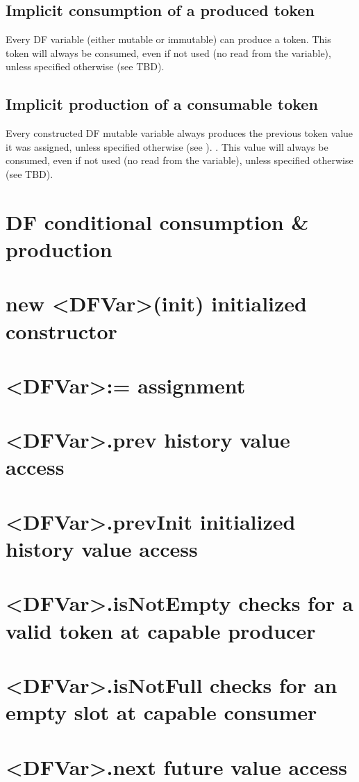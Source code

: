 \subsection*{Implicit consumption of a produced token}
Every DF variable (either mutable or immutable) can produce a token. This token will always be consumed, even if not used (no read from the variable), unless specified otherwise (see TBD). 

\subsection*{Implicit production of a consumable token}
Every constructed DF mutable variable always produces the previous token value it was assigned, unless specified otherwise (see ). . This value will always be consumed, even if not used (no read from the variable), unless specified otherwise (see TBD).

\section{DF conditional consumption \& production}
\section{new <DFVar>(init) initialized constructor}
\section{<DFVar>:= assignment}
\section{<DFVar>.prev history value access}
\section{<DFVar>.prevInit initialized history value access}
\section{<DFVar>.isNotEmpty checks for a valid token at capable producer}
\section{<DFVar>.isNotFull checks for an empty slot at capable consumer}
\section{<DFVar>.next future value access}
